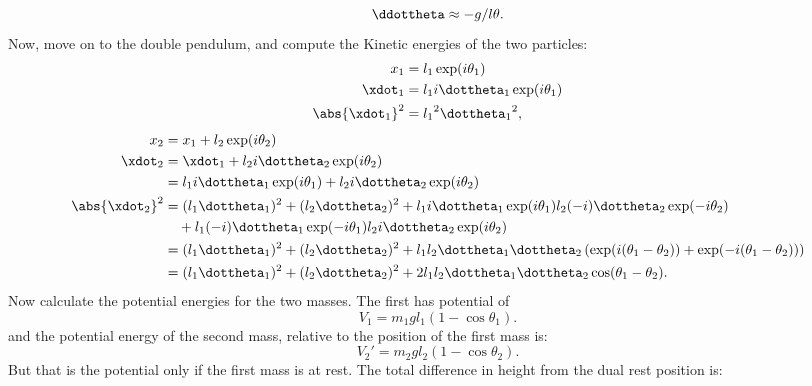 {%
\begin{equation}\label{eqn:tongMf1:1180}
\ddottheta \approx - g/l \theta.
\end{equation}
%
Now, move on to the double pendulum, and compute the Kinetic energies of the two particles:
%
\begin{equation}\label{eqn:tongMf1:240}
\begin{aligned}
x_1 &= l_1 \exp(i\theta_1) \\
\xdot_1 &= l_1 i \dottheta_1 \exp(i\theta_1) \\
\abs{\xdot_1}^2 &= {l_1}^2 {\dottheta_1}^2,
\end{aligned}
\end{equation}
%
\begin{equation}\label{eqn:tongMf1:260}
\begin{aligned}
x_2 &= x_1 + l_2 \exp(i\theta_2) \\
\xdot_2 &= \xdot_1 + l_2 i \dottheta_2 \exp(i\theta_2) \\
        &= l_1 i \dottheta_1 \exp(i\theta_1) + l_2 i \dottheta_2 \exp(i\theta_2) \\
\abs{\xdot_2}^2
&=
(l_1 \dottheta_1)^2 + (l_2 \dottheta_2)^2
+ l_1 i \dottheta_1 \exp(i\theta_1) l_2 (-i) \dottheta_2 \exp(-i\theta_2) \\
&\quad + l_1 (-i) \dottheta_1 \exp(-i\theta_1) l_2 i \dottheta_2 \exp(i\theta_2) \\
&=
(l_1 \dottheta_1)^2 + (l_2 \dottheta_2)^2
+ l_1 l_2 \dottheta_1 \dottheta_2 \left( \exp(i(\theta_1 -\theta_2)) + \exp(-i(\theta_1 - \theta_2)) \right) \\
&=
(l_1 \dottheta_1)^2 + (l_2 \dottheta_2)^2
+ 2 l_1 l_2 \dottheta_1 \dottheta_2 \cos(\theta_1 -\theta_2).
\end{aligned}
\end{equation}
%
Now calculate the potential energies for the two masses.  The first has potential of
%
\begin{equation}\label{eqn:tongMf1:1200}
V_1 = m_1 g l_1 (1 - \cos\theta_1).
\end{equation}
%
and the potential energy of the second mass, relative to the position of the first mass is:
\begin{equation}\label{eqn:tongMf1:1220}
V_2' = m_2 g l_2 (1 - \cos\theta_2).
\end{equation}
%
But that is the potential only if the first mass is at rest.  The total difference in height from the dual rest position is:
\begin{equation}\label{eqn:tongMf1:1240}

\end{equation}}
